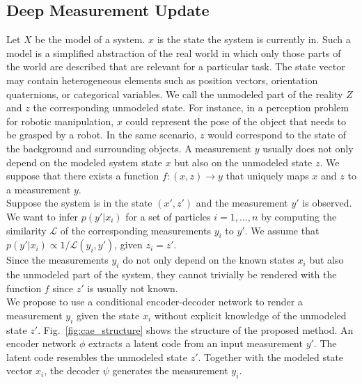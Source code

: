 \documentclass[letterpaper, 10 pt, journal, twoside]{ieeetran}  %
\begin{document}
\subsection{Deep Measurement Update}
\label{ss:dmu}
Let $X$ be the model of a system. $x$ is the state the system is currently in. Such a model is a simplified abstraction of the real world in which only those parts of the world are described that are relevant for a particular task. The state vector may contain heterogeneous elements such as position vectors, orientation quaternions, or categorical variables.
We call the unmodeled part of the reality $Z$ and $z$ the corresponding unmodeled state.  For instance, in a perception problem for robotic manipulation, $x$ could represent the pose of the object that needs to be grasped by a robot. In the same scenario, $z$ would correspond to the state of the background and surrounding objects. A measurement $y$ usually does not only depend on the modeled system state $x$ but also on the unmodeled state $z$. We suppose that there exists a function $f: (x,z) \to y$ that uniquely maps $x$ and $z$ to a measurement $y$.\\
Suppose the system is in the state $(x', z')$ and the measurement $y'$ is observed.
We want to infer $p(y'|x_i)$ for a set of particles $i=1,\dots, n$ by computing the similarity $\mathcal{L}$ of the corresponding measurements $y_i$ to $y'$.
We assume that $p(y'|x_i) \propto 1 / \mathcal{L}(y_i, y')$, given $z_i=z'$.\\
Since the measurements $y_i$ do not only depend on the known states $x_i$ but also the unmodeled part of the system, they cannot trivially be rendered with the function $f$ since $z'$ is usually not known.\\
We propose to use a conditional encoder-decoder network to render a measurement $y_i$ given the state $x_i$ without explicit knowledge of the unmodeled state $z'$.
Fig.~\ref{fig:cae_structure} shows the structure of the proposed method.
An encoder network $\phi$ extracts a latent code from an input measurement $y'$. The latent code resembles the unmodeled state $z'$. Together with the modeled state vector $x_i$, the decoder $\psi$ generates the measurement $y_i$.\\
\end{document}

